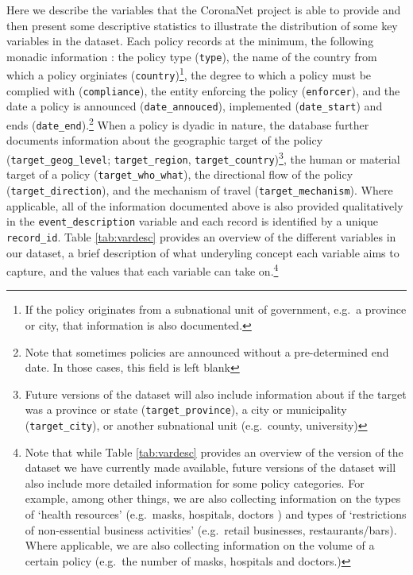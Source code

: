 \documentclass[]{article}
\let\rmarkdownfootnote\footnote%
\def\footnote{\protect\rmarkdownfootnote}
\begin{document}
Here we describe the variables that the CoronaNet project is able to provide and then present some descriptive statistics to illustrate the distribution of some key variables in the dataset. Each policy records at the minimum, the following monadic information : the policy type (\texttt{type}), the name of the country from which a policy orginiates (\texttt{country})\footnote{If the policy originates from a subnational unit of government, e.g.~a province or city, that information is also documented.}, the degree to which a policy must be complied with (\texttt{compliance}), the entity enforcing the policy (\texttt{enforcer}), and the date a policy is announced (\texttt{date\_annouced}), implemented (\texttt{date\_start}) and ends (\texttt{date\_end}).\footnote{Note that sometimes policies are announced without a pre-determined end date. In those cases, this field is left blank} When a policy is dyadic in nature, the database further documents information about the geographic target of the policy (\texttt{target\_geog\_level}; \texttt{target\_region}, \texttt{target\_country})\footnote{Future versions of the dataset will also include information about if the target was a province or state (\texttt{target\_province}), a city or municipality (\texttt{target\_city}), or another subnational unit (e.g.~county, university)}, the human or material target of a policy (\texttt{target\_who\_what}), the directional flow of the policy (\texttt{target\_direction}), and the mechanism of travel (\texttt{target\_mechanism}). Where applicable, all of the information documented above is also provided qualitatively in the \texttt{event\_description} variable and each record is identified by a unique \texttt{record\_id}. Table \ref{tab:vardesc} provides an overview of the different variables in our dataset, a brief description of what underyling concept each variable aims to capture, and the values that each variable can take on.\footnote{Note that while Table \ref{tab:vardesc} provides an overview of the version of the dataset we have currently made available, future versions of the dataset will also include more detailed information for some policy categories. For example, among other things, we are also collecting information on the types of `health resources' (e.g.~masks, hospitals, doctors ) and types of `restrictions of non-essential business activities' (e.g.~retail businesses, restaurants/bars). Where applicable, we are also collecting information on the volume of a certain policy (e.g.~the number of masks, hospitals and doctors.)}
\end{document}
